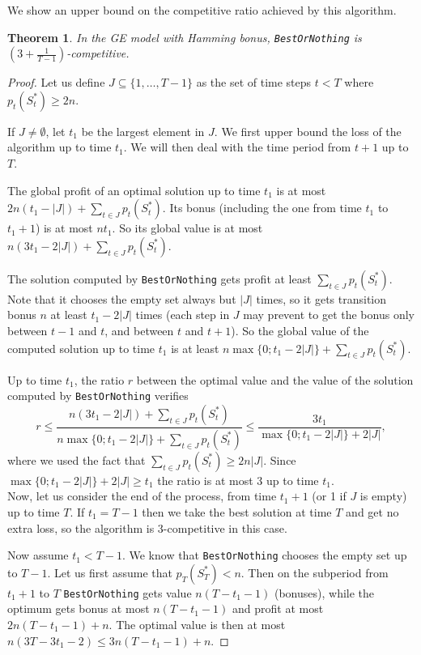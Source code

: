 \documentclass[a4paper]{book}
\newtheorem{theorem}{Theorem}[chapter]
\newtheorem{proof}{\noindent{\bf Proof.} }
\begin{document}
We show an upper bound on the competitive ratio achieved by this algorithm.

\begin{theorem}\label{thm:general-hamming-upper}
In the GE model with Hamming bonus, \texttt{BestOrNothing} is $\left(3+\frac{1}{T-1}\right)$-competitive.
\end{theorem}

\begin{proof}
Let us define $J\subseteq\{1,\dots,T-1\}$ as the set of time steps $t<T$ where $p_t(S_t^*)\geq 2n$. 

If $J\neq \emptyset$, let $t_1$ be the largest element in $J$. We first upper bound the loss of the algorithm up to time $t_1$. We will then deal with the time period from $t+1$ up to $T$.

The global profit of an optimal solution up to time $t_1$ is at most $2n(t_1-|J|)+\sum_{t\in J}p_t(S_t^*)$. Its bonus (including the one from time $t_1$ to $t_1+1$) is at most $nt_1$. So its global value is at most $n\left(3t_1-2|J|\right)+\sum_{t\in J}p_t(S_t^*)$.

The solution computed by \texttt{BestOrNothing} gets profit at least $\sum_{t\in J}p_t(S_t^*)$. Note that it chooses the empty set always but $|J|$ times, so it gets transition bonus $n$ at least $t_1-2|J|$ times (each step in $J$ may prevent to get the bonus only between $t-1$ and $t$, and between $t$ and $t+1$). So the global value of the computed solution up to time $t_1$ is at least $n\max\{0;t_1-2|J|\}+\sum_{t\in J}p_t(S_t^*)$.

Up to time $t_1$, the ratio $r$ between the optimal value and the value of the solution computed by \texttt{BestOrNothing} verifies $$r\leq \frac{n\left(3t_1-2|J|\right)+\sum_{t\in J}p_t(S_t^*)}{n\max\{0;t_1-2|J|\}+\sum_{t\in J}p_t(S_t^*)}\leq \frac{3t_1}{\max\{0;t_1-2|J|\}+2|J|},$$ 
where we used the fact that $\sum_{t\in J}p_t(S_t^*)\geq 2n|J|$.
Since $\max\{0;t_1-2|J|\}+2|J|\geq t_1$ the ratio is at most 3 up to time $t_1$.\\

Now, let us consider the end of the process, from time $t_1+1$ (or 1 if $J$ is empty) up to time $T$. If $t_1=T-1$ then we take the best solution at time $T$ and get no extra loss, so the algorithm is 3-competitive in this case. 

Now assume $t_1<T-1$. We know that \texttt{BestOrNothing} chooses the empty set up to $T-1$. Let us first assume that $p_T(S^*_T)<n$. Then on the subperiod from $t_1+1$ to $T$ \texttt{BestOrNothing} gets value $n(T-t_1-1)$ (bonuses), while the optimum gets bonus at most $n(T-t_1-1)$ and profit at most $2n(T-t_1-1)+n$. The optimal value is then at most $n\left( 3T-3t_1-2\right)\leq 3n(T-t_1-1)+n$.


\end{proof}
\end{document}
